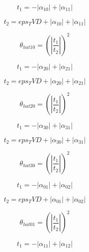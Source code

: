 \documentclass{article}
\begin{document}
\begin{dmath}t_{1} = - \left|{\alpha_{10}}\right| + \left|{\alpha_{11}}\right|\end{dmath}

\begin{dmath}t_{2} = eps_TVD + \left|{\alpha_{10}}\right| + \left|{\alpha_{11}}\right|\end{dmath}

\begin{dmath}\theta_{hat 10} = \left(\left|{\frac{t_{1}}{t_{2}}}\right| \right)^{2}\end{dmath}

\begin{dmath}t_{1} = - \left|{\alpha_{20}}\right| + \left|{\alpha_{21}}\right|\end{dmath}

\begin{dmath}t_{2} = eps_TVD + \left|{\alpha_{20}}\right| + \left|{\alpha_{21}}\right|\end{dmath}

\begin{dmath}\theta_{hat 20} = \left(\left|{\frac{t_{1}}{t_{2}}}\right| \right)^{2}\end{dmath}

\begin{dmath}t_{1} = - \left|{\alpha_{30}}\right| + \left|{\alpha_{31}}\right|\end{dmath}

\begin{dmath}t_{2} = eps_TVD + \left|{\alpha_{30}}\right| + \left|{\alpha_{31}}\right|\end{dmath}

\begin{dmath}\theta_{hat 30} = \left(\left|{\frac{t_{1}}{t_{2}}}\right| \right)^{2}\end{dmath}

\begin{dmath}t_{1} = - \left|{\alpha_{01}}\right| + \left|{\alpha_{02}}\right|\end{dmath}

\begin{dmath}t_{2} = eps_TVD + \left|{\alpha_{01}}\right| + \left|{\alpha_{02}}\right|\end{dmath}

\begin{dmath}\theta_{hat 01} = \left(\left|{\frac{t_{1}}{t_{2}}}\right| \right)^{2}\end{dmath}

\begin{dmath}t_{1} = - \left|{\alpha_{11}}\right| + \left|{\alpha_{12}}\right|\end{dmath}
\end{document}
